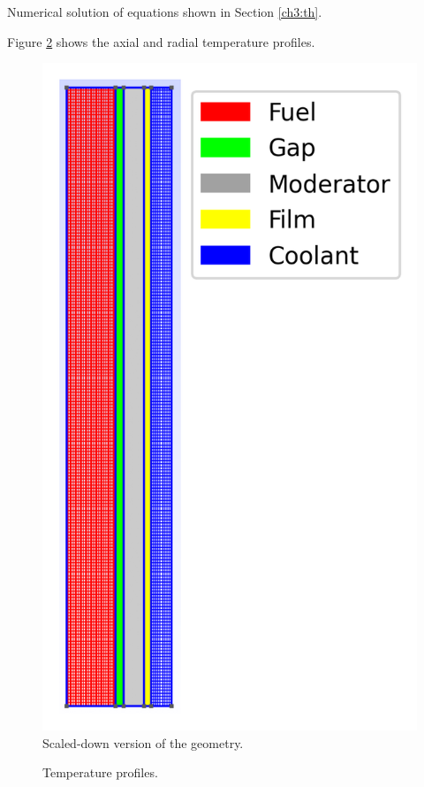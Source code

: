Numerical solution of equations shown in Section \ref{ch3:th}.

Figure \ref{fig:th-ver-results} shows the axial and radial temperature profiles.

\begin{figure}[htbp!]
	\centering
	\includegraphics[width=0.35\linewidth]{figures-thermal/2D-preliminar-mesh2}
	\hfill
	\caption{Scaled-down version of the geometry.}
	\label{fig:th-ver-mesh}
\end{figure}

\begin{figure}[htbp!]
	\centering
	\hfill
    \caption{Temperature profiles.}
	\label{fig:th-ver-results}
\end{figure}

